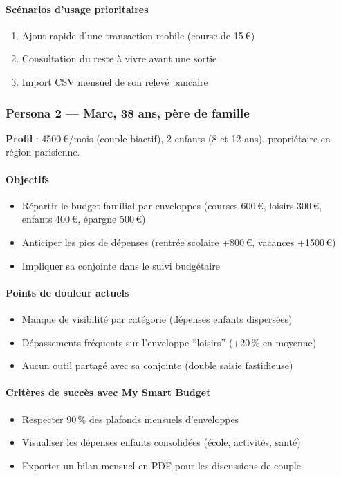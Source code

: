 \paragraph{Scénarios d'usage prioritaires}
\begin{enumerate}
  \item Ajout rapide d'une transaction mobile (course de 15\,€)
  \item Consultation du reste à vivre avant une sortie
  \item Import CSV mensuel de son relevé bancaire
\end{enumerate}

\subsubsection{Persona 2 --- Marc, 38 ans, père de famille}

\textbf{Profil} : 4500\,€/mois (couple biactif), 2 enfants (8 et 12 ans), propriétaire en région parisienne.

\paragraph{Objectifs}
\begin{itemize}
  \item Répartir le budget familial par enveloppes (courses 600\,€, loisirs 300\,€, enfants 400\,€, épargne 500\,€)
  \item Anticiper les pics de dépenses (rentrée scolaire +800\,€, vacances +1500\,€)
  \item Impliquer sa conjointe dans le suivi budgétaire
\end{itemize}

\paragraph{Points de douleur actuels}
\begin{itemize}
  \item Manque de visibilité par catégorie (dépenses enfants dispersées)
  \item Dépassements fréquents sur l'enveloppe ``loisirs'' (+20\,\% en moyenne)
  \item Aucun outil partagé avec sa conjointe (double saisie fastidieuse)
\end{itemize}

\paragraph{Critères de succès avec My Smart Budget}
\begin{itemize}
  \item Respecter 90\,\% des plafonds mensuels d'enveloppes
  \item Visualiser les dépenses enfants consolidées (école, activités, santé)
  \item Exporter un bilan mensuel en PDF pour les discussions de couple
\end{itemize}

